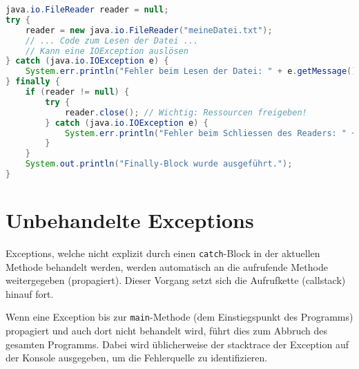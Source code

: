 \begin{lstlisting}[language=Java, caption={Beispiel für einen finally-Block}, label=lst:finallyblock_beispiel]
java.io.FileReader reader = null;
try {
    reader = new java.io.FileReader("meineDatei.txt");
    // ... Code zum Lesen der Datei ...
    // Kann eine IOException auslösen
} catch (java.io.IOException e) {
    System.err.println("Fehler beim Lesen der Datei: " + e.getMessage());
} finally {
    if (reader != null) {
        try {
            reader.close(); // Wichtig: Ressourcen freigeben!
        } catch (java.io.IOException e) {
            System.err.println("Fehler beim Schliessen des Readers: " + e.getMessage());
        }
    }
    System.out.println("Finally-Block wurde ausgeführt.");
}
\end{lstlisting}

\section{Unbehandelte Exceptions}

Exceptions, welche nicht explizit durch einen \texttt{catch}-Block in der aktuellen Methode behandelt werden, werden automatisch an die aufrufende Methode weitergegeben (propagiert). Dieser Vorgang setzt sich die Aufrufkette (\gls{callstack}) hinauf fort.

Wenn eine Exception bis zur \texttt{main}-Methode (dem Einstiegspunkt des Programms) propagiert und auch dort nicht behandelt wird, führt dies zum Abbruch des gesamten Programms. Dabei wird üblicherweise der \gls{stacktrace} der Exception auf der Konsole ausgegeben, um die Fehlerquelle zu identifizieren.
